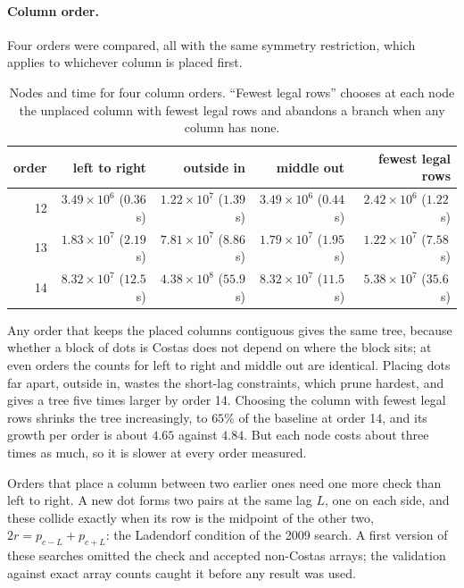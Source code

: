\documentclass[11pt,a4paper,oneside]{report}
\theoremstyle{definition}
\begin{document}
\paragraph{Column order.} Four orders were compared, all with the same symmetry restriction, which applies
to whichever column is placed first.

\begin{table}[H]
\centering
\small
\begin{tabular}{@{}rrrrr@{}}
\toprule
order & left to right & outside in & middle out & fewest legal rows \\
\midrule
12 & $3.49\times10^6$ ($0.36$\,s) & $1.22\times10^7$ ($1.39$\,s) & $3.49\times10^6$ ($0.44$\,s) & $2.42\times10^6$ ($1.22$\,s) \\
13 & $1.83\times10^7$ ($2.19$\,s) & $7.81\times10^7$ ($8.86$\,s) & $1.79\times10^7$ ($1.95$\,s) & $1.22\times10^7$ ($7.58$\,s) \\
14 & $8.32\times10^7$ ($12.5$\,s) & $4.38\times10^8$ ($55.9$\,s) & $8.32\times10^7$ ($11.5$\,s) & $5.38\times10^7$ ($35.6$\,s) \\
\bottomrule
\end{tabular}
\caption{Nodes and time for four column orders. ``Fewest legal rows'' chooses at each node the unplaced
column with fewest legal rows and abandons a branch when any column has none.}
\label{p9-tab:orders}
\end{table}

\noindent Any order that keeps the placed columns contiguous gives the same tree, because whether a block
of dots is Costas does not depend on where the block sits; at even orders the counts for left to right and
middle out are identical. Placing dots far apart, outside in, wastes the short-lag constraints, which prune
hardest, and gives a tree five times larger by order 14. Choosing the column with fewest legal rows shrinks
the tree increasingly, to $65\%$ of the baseline at order 14, and its growth per order is about $4.65$
against $4.84$. But each node costs about three times as much, so it is slower at every order measured.

Orders that place a column between two earlier ones need one more check than left to right. A new dot
forms two pairs at the same lag $L$, one on each side, and these collide exactly when its row is the
midpoint of the other two, $2r=p_{c-L}+p_{c+L}$: the Ladendorf condition of the 2009 search. A first
version of these searches omitted the check and accepted non-Costas arrays; the validation against exact
array counts caught it before any result was used.
\end{document}
